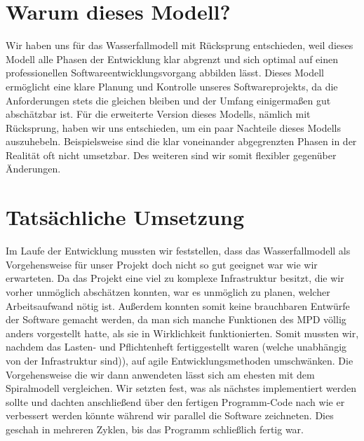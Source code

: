 \section{Warum dieses Modell?}
Wir haben uns für das Wasserfallmodell mit Rücksprung entschieden, weil dieses Modell alle Phasen der 
Entwicklung klar abgrenzt und sich optimal auf einen professionellen Softwareentwicklungsvorgang
abbilden lässt. Dieses Modell ermöglicht eine klare Planung und Kontrolle unseres Softwareprojekts,
da die Anforderungen stets die gleichen bleiben und der Umfang einigermaßen gut abschätzbar ist.
Für die erweiterte Version dieses Modells, nämlich mit Rücksprung, haben wir uns entschieden, um ein 
paar Nachteile dieses Modells auszuhebeln. Beispielsweise sind die klar voneinander abgegrenzten Phasen
in der Realität oft nicht umsetzbar. Des weiteren sind wir somit flexibler gegenüber Änderungen.
\section{Tatsächliche Umsetzung}
Im Laufe der Entwicklung mussten wir feststellen, dass das Wasserfallmodell als Vorgehensweise für unser
Projekt doch nicht so gut geeignet war wie wir erwarteten. Da das Projekt eine viel zu komplexe Infrastruktur
besitzt, die wir vorher unmöglich abschätzen konnten, war es unmöglich zu planen, welcher Arbeitsaufwand nötig ist.
Außerdem konnten somit keine brauchbaren Entwürfe der Software gemacht werden, da man sich manche Funktionen des MPD
völlig anders vorgestellt hatte, als sie in Wirklichkeit funktionierten. Somit mussten wir, nachdem
das Lasten- und Pflichtenheft fertiggestellt waren (welche unabhängig von der Infrastruktur sind)), auf agile
Entwicklungsmethoden umschwänken. Die Vorgehensweise die wir dann anwendeten lässt sich am ehesten mit dem Spiralmodell
vergleichen. Wir setzten fest, was als nächstes implementiert werden sollte und dachten anschließend über den fertigen 
Programm-Code nach wie er verbessert werden könnte während wir parallel die Software zeichneten. Dies geschah
in mehreren Zyklen, bis das Programm schließlich fertig war.
